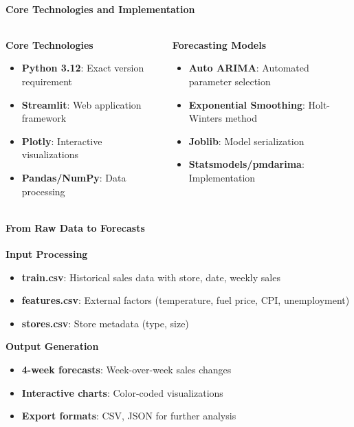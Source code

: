 {
	\framesubtitle{Core Technologies and Implementation}
	\begin{columns}[T]
		\begin{column}{0.5\textwidth}
			\textbf{Core Technologies}
			\begin{itemize}
				\item \textbf{Python 3.12}: Exact version requirement
				\item \textbf{Streamlit}: Web application framework
				\item \textbf{Plotly}: Interactive visualizations
				\item \textbf{Pandas/NumPy}: Data processing
			\end{itemize}
		\end{column}
		
		\begin{column}{0.5\textwidth}
			\textbf{Forecasting Models}
			\begin{itemize}
				\item \textbf{Auto ARIMA}: Automated parameter selection
				\item \textbf{Exponential Smoothing}: Holt-Winters method
				\item \textbf{Joblib}: Model serialization
				\item \textbf{Statsmodels/pmdarima}: Implementation
			\end{itemize}
		\end{column}
	\end{columns}
}

{
  \framesubtitle{From Raw Data to Forecasts}
  \begin{figure}[!h]
    \centering
   
  \end{figure}
  
  \textbf{Input Processing}
  \begin{itemize}
    \item \textbf{train.csv}: Historical sales data with store, date, weekly sales
    \item \textbf{features.csv}: External factors (temperature, fuel price, CPI, unemployment)
    \item \textbf{stores.csv}: Store metadata (type, size)
  \end{itemize}

  \textbf{Output Generation}
  \begin{itemize}
    \item \textbf{4-week forecasts}: Week-over-week sales changes
    \item \textbf{Interactive charts}: Color-coded visualizations
    \item \textbf{Export formats}: CSV, JSON for further analysis
  \end{itemize}
}

